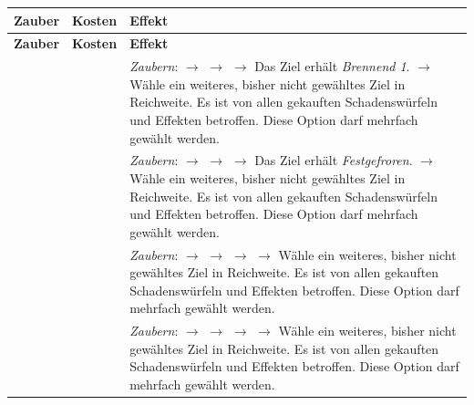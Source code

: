 \begingroup
\hplongtablestyle
\begin{xltabular}{\linewidth}{L{3.4cm} C{2.1cm} Y}
\textbf{Zauber} & \textbf{Kosten} & \textbf{Effekt} \\
\hline
\endfirsthead
\textbf{Zauber} & \textbf{Kosten} & \textbf{Effekt} \\
\hline
\endhead
{} &  & \emph{Zaubern}: \star{} $\rightarrow$ \redDmgDie{}\star{} $\rightarrow$ \redDmgDie{}\redDmgDie{}\newline \star{} $\rightarrow$ Das Ziel erhält \statusBurning{} \emph{Brennend 1}.\manaLoss{} $\rightarrow$ Wähle ein weiteres, bisher nicht gewähltes Ziel in Reichweite. Es ist von allen gekauften Schadenswürfeln und Effekten betroffen. Diese Option darf mehrfach gewählt werden. \\
 &  & \emph{Zaubern}: \star{} $\rightarrow$ \redDmgDie{}\star{} $\rightarrow$ \redDmgDie{}\redDmgDie{}\star{} $\rightarrow$ Das Ziel erhält \statusFrozen{} \emph{Festgefroren}.\manaLoss{} $\rightarrow$ Wähle ein weiteres, bisher nicht gewähltes Ziel in Reichweite. Es ist von allen gekauften Schadenswürfeln und Effekten betroffen. Diese Option darf mehrfach gewählt werden. \\
 &  & \emph{Zaubern}: \star{} $\rightarrow$ \redDmgDie{}\star{} $\rightarrow$ \redDmgDie{}\redDmgDie{}\newline \star{} $\rightarrow$ \effectPush{}\manaLoss{} $\rightarrow$ Wähle ein weiteres, bisher nicht gewähltes Ziel in Reichweite. Es ist von allen gekauften Schadenswürfeln und Effekten betroffen. Diese Option darf mehrfach gewählt werden. \\
 &  & \emph{Zaubern}: \star{} $\rightarrow$ \redDmgDie{}\star{} $\rightarrow$ \redDmgDie{}\redDmgDie{}\star{} $\rightarrow$ \effectKnockdown{}\manaLoss{} $\rightarrow$ Wähle ein weiteres, bisher nicht gewähltes Ziel in Reichweite. Es ist von allen gekauften Schadenswürfeln und Effekten betroffen. Diese Option darf mehrfach gewählt werden. \\

\end{xltabular}
